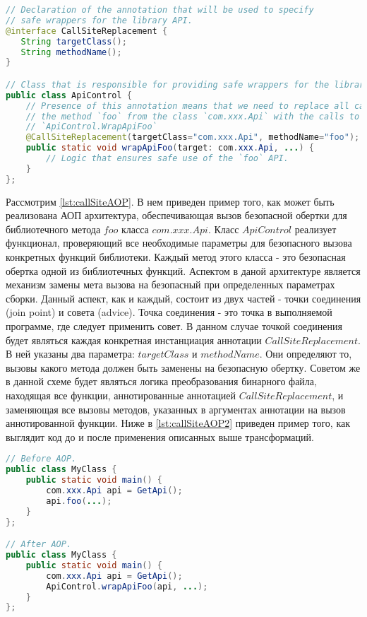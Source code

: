 \begin{lstlisting}[language=Java, caption=Пример решения задачи замены функции в месте вызова при помощи АОП, label=lst:callSiteAOP]
// Declaration of the annotation that will be used to specify
// safe wrappers for the library API.
@interface CallSiteReplacement {
   String targetClass();
   String methodName();
}

// Class that is responsible for providing safe wrappers for the library API.
public class ApiControl {
    // Presence of this annotation means that we need to replace all calls to
    // the method `foo` from the class `com.xxx.Api` with the calls to
    // `ApiControl.WrapApiFoo`
    @CallSiteReplacement(targetClass="com.xxx.Api", methodName="foo");
    public static void wrapApiFoo(target: com.xxx.Api, ...) {
        // Logic that ensures safe use of the `foo` API.
    }
};
\end{lstlisting}

Рассмотрим \autoref{lst:callSiteAOP}. В нем приведен пример того, как может быть реализована АОП архитектура, обеспечивающая вызов безопасной обертки для библиотечного метода $foo$ класса $com.xxx.Api$. Класс $ApiControl$ реализует функционал, проверяющий все необходимые параметры для безопасного вызова конкретных функций библиотеки. Каждый метод этого класса - это безопасная обертка одной из библиотечных функций. Аспектом в даной архитектуре является механизм замены мета вызова на безопасный при определенных параметрах сборки. Данный аспект, как и каждый, состоит из двух частей - точки соединения (join point) и совета (advice). Точка соединения - это точка в выполняемой программе, где следует применить совет. В данном случае точкой соединения будет являться каждая конкретная инстанциация аннотации $CallSiteReplacement$. В ней указаны два параметра: $targetClass$ и $methodName$. Они определяют то, вызовы какого метода должен быть заменены на безопасную обертку. Советом же в данной схеме будет являться логика преобразования бинарного файла, находящая все функции, аннотированные аннотацией $CallSiteReplacement$, и заменяющая все вызовы методов, указанных в аргументах аннотации на вызов аннотированной функции. Ниже в  \autoref{lst:callSiteAOP2} приведен пример того, как выглядит код до и после применения описанных выше трансформаций.

\begin{lstlisting}[language=Java, caption=Демонстрация работы аспекта, label=lst:callSiteAOP2]
// Before AOP.
public class MyClass {
    public static void main() {
        com.xxx.Api api = GetApi();
        api.foo(...);
    }
};

// After AOP.
public class MyClass {
    public static void main() {
        com.xxx.Api api = GetApi();
        ApiControl.wrapApiFoo(api, ...);
    }
};
\end{lstlisting}

